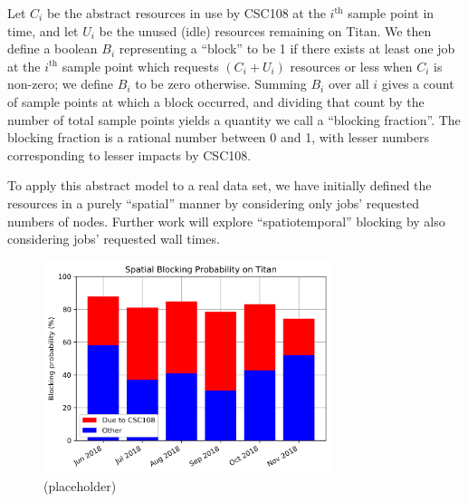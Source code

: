 Let $C_i$ be the abstract resources in use by CSC108 at the $i^{\text{th}}$
sample point in time, and let $U_i$ be the unused (idle) resources remaining on
Titan. We then define a boolean $B_i$ representing a ``block'' to be 1 if there
exists at least one job at the $i^{\text{th}}$ sample point which requests
$(C_i + U_i)$ resources or less when $C_i$ is non-zero; we define $B_i$ to be
zero otherwise. Summing $B_i$ over all $i$ gives a count of sample points at
which a block occurred, and dividing that count by the number of total sample
points yields a quantity we call a ``blocking fraction''. The blocking fraction
is a rational number between 0 and 1, with lesser numbers corresponding to
lesser impacts by CSC108.

To apply this abstract model to a real data set, we have initially defined the
resources in a purely ``spatial'' manner by considering only jobs' requested
numbers of nodes. Further work will explore ``spatiotemporal'' blocking by also
considering jobs' requested wall times.


\begin{figure}
  \includegraphics[width=0.75\textwidth]{images/barplot-spatial-blocking-by-month.png}
\caption{(placeholder)}
\label{fig:spatial-blocking-by-month}
\end{figure}


